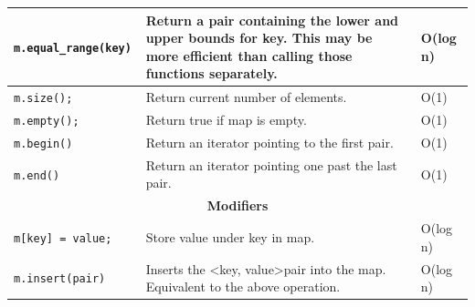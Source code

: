 \documentclass[12 pt, twoside] {article}
\begin{document}
{\begin{table}[h]
\begin{tabular}{|p{}|p{}|l|}
\texttt{m.equal\_range(key)  }                                                         & Return a pair containing the lower and upper bounds for key. This may be more efficient than calling those functions separately.                              & O(log n)   \\ \hline
\texttt{m.size();            }                                                         & Return current number of elements.                                                                                                                            & O(1)       \\ \hline
\texttt{m.empty();           }                                                         & Return true if map is empty.                                                                                                                                  & O(1)       \\ \hline
\texttt{m.begin()            }                                                         & Return an iterator pointing to the first pair.                                                                                                                & O(1)       \\ \hline
\texttt{m.end()              }                                                         & Return an iterator pointing one past the last pair.                                                                                                           & O(1)       \\ \hline
\multicolumn{3}{|c|}{\textbf{Modifiers}}                                                                                                                                                                                                                   \\ \hline
\texttt{m{[}key{]} = value;}                                                           & Store value under key in map.                                                                                                                                 & O(log n)   \\ \hline
\texttt{m.insert(pair)     }                                                           & Inserts the \textless key, value\textgreater pair into the map. Equivalent to the above operation.                                                             & O(log n)   \\ \hline
\end{tabular}
\end{table}

}
\end{document}

